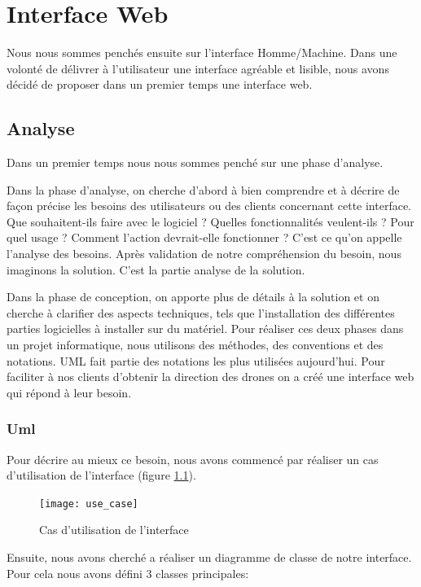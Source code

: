 
\chapter{Interface Web}
\label{Logiciel}

Nous nous sommes penchés ensuite sur l'interface Homme/Machine. Dans une volonté de délivrer à l'utilisateur une interface agréable et lisible, nous avons décidé de proposer dans un premier temps une interface web.

\section{Analyse}
\label{sec:uml}

Dans un premier temps nous nous sommes penché sur une  phase d'analyse.

Dans la phase d’analyse, on cherche d’abord à bien comprendre et à décrire de façon précise les besoins des utilisateurs ou des clients concernant cette interface. Que souhaitent-ils faire avec le logiciel ? Quelles fonctionnalités veulent-ils ? Pour quel usage ? Comment l’action devrait-elle fonctionner ? C’est ce qu’on appelle \og l’analyse des besoins\fg{}. Après validation de notre compréhension du besoin, nous imaginons la solution. C’est la partie analyse de la solution.

Dans la phase de conception, on apporte plus de détails à la solution et on cherche à clarifier des aspects techniques, tels que l’installation des différentes parties logicielles à installer sur du matériel. Pour réaliser ces deux phases dans un projet informatique, nous utilisons des méthodes, des conventions et des notations. UML fait partie des notations les plus utilisées aujourd’hui. Pour faciliter à nos clients d’obtenir la direction des drones on a créé une interface web qui répond à leur besoin.

\subsection{Uml}

Pour décrire au mieux ce besoin, nous avons commencé par réaliser un cas d'utilisation de l'interface (figure \ref{fig:use_case}).
\begin{figure}[!h]
  \centering
  \texttt{[image: use\_case]}
  \caption{Cas d'utilisation de l'interface}
  \label{fig:use_case}
\end{figure}

\newpage
Ensuite, nous avons cherché a réaliser un diagramme de classe de notre interface. Pour cela nous avons défini 3 classes principales:

